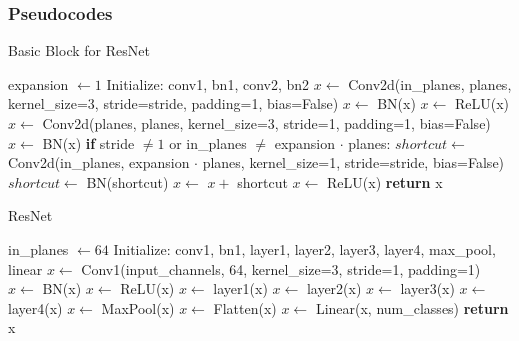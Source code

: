 \documentclass[10pt]{article}
\begin{document}
\subsubsection{Pseudocodes}
\begin{algorithm}[H]
  \caption{Basic Block for ResNet}
  \begin{algorithmic}[1]
      \State expansion $\gets 1$
      \State
      \State Initialize: conv1, bn1, conv2, bn2
      \State
      \State $x \gets$ Conv2d(in\_planes, planes, kernel\_size=3, stride=stride, padding=1, bias=False) 
      \State $x \gets$ BN(x) 
      \State $x \gets$ ReLU(x) 
      \State
      \State $x \gets$ Conv2d(planes, planes, kernel\_size=3, stride=1, padding=1, bias=False) 
      \State $x \gets$ BN(x) 
      \State
      \State \textbf{if} stride $\neq 1$ or in\_planes $\neq$ expansion $\cdot$ planes:
      \State \hspace{1cm} $shortcut \gets$ Conv2d(in\_planes, expansion $\cdot$ planes, kernel\_size=1, stride=stride, bias=False) 
      \State \hspace{1cm} $shortcut \gets$ BN(shortcut) 
      \State
      \State $x \gets$ $x +$ shortcut 
      \State $x \gets$ ReLU(x) 
      \State
      \State \textbf{return} x 
    \EndProcedure
  \end{algorithmic}
\end{algorithm}


\begin{algorithm}[H]
  \caption{ResNet}
  \begin{algorithmic}[1]
      \State in\_planes $\gets 64$
      \State
      \State Initialize: conv1, bn1, layer1, layer2, layer3, layer4, max\_pool, linear
      \State
      \State $x \gets$ Conv1(input\_channels, 64, kernel\_size=3, stride=1, padding=1) 
      \State $x \gets$ BN(x) 
      \State $x \gets$ ReLU(x) 
      \State
      \State $x \gets$ layer1(x) 
      \State $x \gets$ layer2(x) 
      \State $x \gets$ layer3(x) 
      \State $x \gets$ layer4(x) 
      \State
      \State $x \gets$ MaxPool(x) 
      \State $x \gets$ Flatten(x) 
      \State $x \gets$ Linear(x, num\_classes) 
      \State
      \State \textbf{return} x 
    \EndProcedure
  \end{algorithmic}
\end{algorithm}
\end{document}
